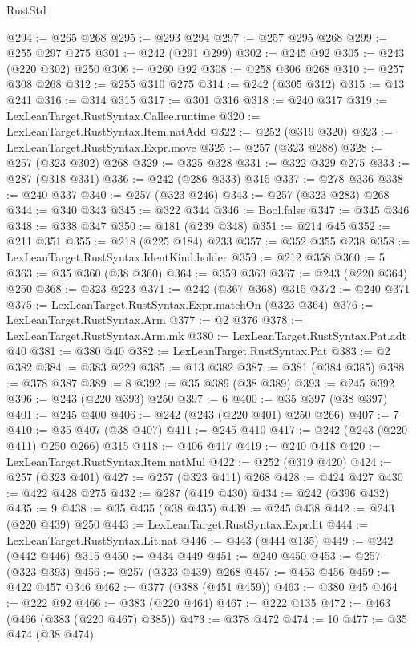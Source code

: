 \begin{lexlean}{RustStd}
\begin{coremodule}
@294 := @265 @268
@295 := @293 @294
@297 := @257 @295 @268
@299 := @255 @297 @275
@301 := @242 (@291 @299)
@302 := @245 @92
@305 := @243 (@220 @302) @250
@306 := @260 @92
@308 := @258 @306 @268
@310 := @257 @308 @268
@312 := @255 @310 @275
@314 := @242 (@305 @312)
@315 := @13 @241
@316 := @314 @315
@317 := @301 @316
@318 := @240 @317
@319 := LexLeanTarget.RustSyntax.Callee.runtime
@320 := LexLeanTarget.RustSyntax.Item.natAdd
@322 := @252 (@319 @320)
@323 := LexLeanTarget.RustSyntax.Expr.move
@325 := @257 (@323 @288)
@328 := @257 (@323 @302) @268
@329 := @325 @328
@331 := @322 @329 @275
@333 := @287 (@318 @331)
@336 := @242 (@286 @333) @315
@337 := @278 @336
@338 := @240 @337
@340 := @257 (@323 @246)
@343 := @257 (@323 @283) @268
@344 := @340 @343
@345 := @322 @344
@346 := Bool.false
@347 := @345 @346
@348 := @338 @347
@350 := @181 (@239 @348)
@351 := @214 @45
@352 := @211 @351
@355 := @218 (@225 @184) @233
@357 := @352 @355 @238
@358 := LexLeanTarget.RustSyntax.IdentKind.holder
@359 := @212 @358
@360 := 5
@363 := @35 @360 (@38 @360)
@364 := @359 @363
@367 := @243 (@220 @364) @250
@368 := @323 @223
@371 := @242 (@367 @368) @315
@372 := @240 @371
@375 := LexLeanTarget.RustSyntax.Expr.matchOn (@323 @364)
@376 := LexLeanTarget.RustSyntax.Arm
@377 := @2 @376
@378 := LexLeanTarget.RustSyntax.Arm.mk
@380 := LexLeanTarget.RustSyntax.Pat.adt @40
@381 := @380 @40
@382 := LexLeanTarget.RustSyntax.Pat
@383 := @2 @382
@384 := @383 @229
@385 := @13 @382
@387 := @381 (@384 @385)
@388 := @378 @387
@389 := 8
@392 := @35 @389 (@38 @389)
@393 := @245 @392
@396 := @243 (@220 @393) @250
@397 := 6
@400 := @35 @397 (@38 @397)
@401 := @245 @400
@406 := @242 (@243 (@220 @401) @250 @266)
@407 := 7
@410 := @35 @407 (@38 @407)
@411 := @245 @410
@417 := @242 (@243 (@220 @411) @250 @266) @315
@418 := @406 @417
@419 := @240 @418
@420 := LexLeanTarget.RustSyntax.Item.natMul
@422 := @252 (@319 @420)
@424 := @257 (@323 @401)
@427 := @257 (@323 @411) @268
@428 := @424 @427
@430 := @422 @428 @275
@432 := @287 (@419 @430)
@434 := @242 (@396 @432)
@435 := 9
@438 := @35 @435 (@38 @435)
@439 := @245 @438
@442 := @243 (@220 @439) @250
@443 := LexLeanTarget.RustSyntax.Expr.lit
@444 := LexLeanTarget.RustSyntax.Lit.nat
@446 := @443 (@444 @135)
@449 := @242 (@442 @446) @315
@450 := @434 @449
@451 := @240 @450
@453 := @257 (@323 @393)
@456 := @257 (@323 @439) @268
@457 := @453 @456
@459 := @422 @457 @346
@462 := @377 (@388 (@451 @459))
@463 := @380 @45
@464 := @222 @92
@466 := @383 (@220 @464)
@467 := @222 @135
@472 := @463 (@466 (@383 (@220 @467) @385))
@473 := @378 @472
@474 := 10
@477 := @35 @474 (@38 @474)

\end{coremodule}
\end{lexlean}

